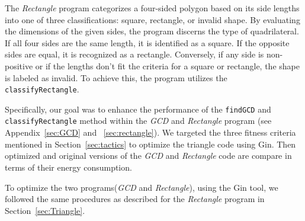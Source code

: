 \vspace{.5em}
The \textit{Rectangle} program categorizes a four-sided polygon based on its side lengths into one of three classifications: square, rectangle, or invalid shape. By evaluating the dimensions of the given sides, the program discerns the type of quadrilateral. If all four sides are the same length, it is identified as a square. If the opposite sides are equal, it is recognized as a rectangle. Conversely, if any side is non-positive or if the lengths don't fit the criteria for a square or rectangle, the shape is labeled as invalid. To achieve this, the program utilizes the \texttt{classifyRectangle}.

\vspace{.5em}
Specifically, our goal was to enhance the performance of the \texttt{findGCD} and \texttt{classifyRectangle} method within the \textit{GCD} and \textit{Rectangle} program (see Appendix~\ref{sec:GCD} and ~\ref{sec:rectangle}). We targeted the three fitness criteria mentioned in Section~\ref{sec:tactics} to optimize the triangle code using Gin. Then optimized and original versions of the \textit{GCD} and \textit{Rectangle} code are compare in terms of their energy consumption.

\vspace{.5em}
To optimize the two programs(\textit{GCD} and \textit{Rectangle}), using the Gin tool, we followed the same procedures as described for the \textit{Rectangle} program in Section~\ref{sec:Triangle}.



